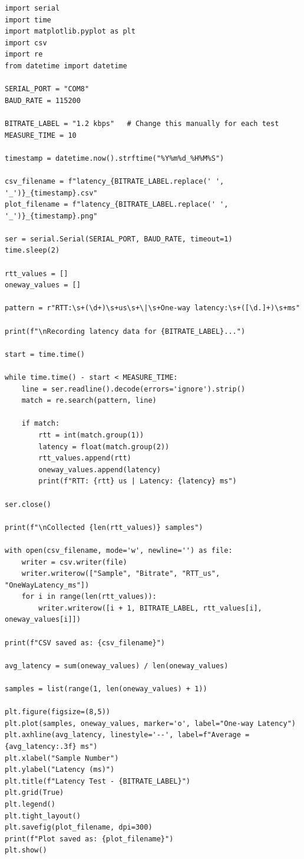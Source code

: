 \begin{lstlisting}[style=appendix-py, caption={Latency vs.\ bitrate measurement}, label={lst:bitrate-latency}]
import serial
import time
import matplotlib.pyplot as plt
import csv
import re
from datetime import datetime

SERIAL_PORT = "COM8"
BAUD_RATE = 115200

BITRATE_LABEL = "1.2 kbps"   # Change this manually for each test
MEASURE_TIME = 10

timestamp = datetime.now().strftime("%Y%m%d_%H%M%S")

csv_filename = f"latency_{BITRATE_LABEL.replace(' ', '_')}_{timestamp}.csv"
plot_filename = f"latency_{BITRATE_LABEL.replace(' ', '_')}_{timestamp}.png"

ser = serial.Serial(SERIAL_PORT, BAUD_RATE, timeout=1)
time.sleep(2)

rtt_values = []
oneway_values = []

pattern = r"RTT:\s+(\d+)\s+us\s+\|\s+One-way latency:\s+([\d.]+)\s+ms"

print(f"\nRecording latency data for {BITRATE_LABEL}...")

start = time.time()

while time.time() - start < MEASURE_TIME:
    line = ser.readline().decode(errors='ignore').strip()
    match = re.search(pattern, line)

    if match:
        rtt = int(match.group(1))
        latency = float(match.group(2))
        rtt_values.append(rtt)
        oneway_values.append(latency)
        print(f"RTT: {rtt} us | Latency: {latency} ms")

ser.close()

print(f"\nCollected {len(rtt_values)} samples")

with open(csv_filename, mode='w', newline='') as file:
    writer = csv.writer(file)
    writer.writerow(["Sample", "Bitrate", "RTT_us", "OneWayLatency_ms"])
    for i in range(len(rtt_values)):
        writer.writerow([i + 1, BITRATE_LABEL, rtt_values[i], oneway_values[i]])

print(f"CSV saved as: {csv_filename}")

avg_latency = sum(oneway_values) / len(oneway_values)

samples = list(range(1, len(oneway_values) + 1))

plt.figure(figsize=(8,5))
plt.plot(samples, oneway_values, marker='o', label="One-way Latency")
plt.axhline(avg_latency, linestyle='--', label=f"Average = {avg_latency:.3f} ms")
plt.xlabel("Sample Number")
plt.ylabel("Latency (ms)")
plt.title(f"Latency Test - {BITRATE_LABEL}")
plt.grid(True)
plt.legend()
plt.tight_layout()
plt.savefig(plot_filename, dpi=300)
print(f"Plot saved as: {plot_filename}")
plt.show()
\end{lstlisting}

